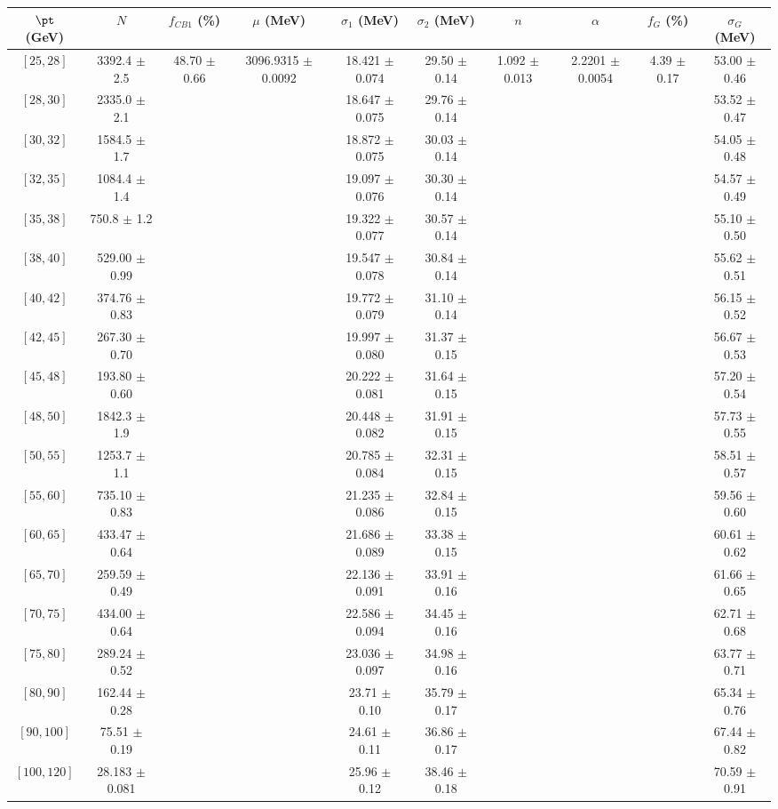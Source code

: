 \begin{tabular}{c||c|c|c|c|c|c|c|c|c}
$\pt$ (GeV) & $N$ & $f_{CB1}$ (\%)  & $\mu$ (MeV) & $\sigma_1$ (MeV) & $\sigma_2$ (MeV) & $n$ & $\alpha$ & $f_G$ (\%) & $\sigma_G$ (MeV) \\
\hline
$[25, 28]$ & 3392.4 $\pm$ 2.5 & \multirow{19}{*}{48.70 $\pm$ 0.66} & \multirow{19}{*}{3096.9315 $\pm$ 0.0092} & 18.421 $\pm$ 0.074 & 29.50 $\pm$ 0.14 & \multirow{19}{*}{1.092 $\pm$ 0.013} & \multirow{19}{*}{2.2201 $\pm$ 0.0054} & \multirow{19}{*}{4.39 $\pm$ 0.17} & 53.00 $\pm$ 0.46\\
$[28, 30]$ & 2335.0 $\pm$ 2.1 &  &  & 18.647 $\pm$ 0.075 & 29.76 $\pm$ 0.14 &  &  &  & 53.52 $\pm$ 0.47\\
$[30, 32]$ & 1584.5 $\pm$ 1.7 &  &  & 18.872 $\pm$ 0.075 & 30.03 $\pm$ 0.14 &  &  &  & 54.05 $\pm$ 0.48\\
$[32, 35]$ & 1084.4 $\pm$ 1.4 &  &  & 19.097 $\pm$ 0.076 & 30.30 $\pm$ 0.14 &  &  &  & 54.57 $\pm$ 0.49\\
$[35, 38]$ & 750.8 $\pm$ 1.2 &  &  & 19.322 $\pm$ 0.077 & 30.57 $\pm$ 0.14 &  &  &  & 55.10 $\pm$ 0.50\\
$[38, 40]$ & 529.00 $\pm$ 0.99 &  &  & 19.547 $\pm$ 0.078 & 30.84 $\pm$ 0.14 &  &  &  & 55.62 $\pm$ 0.51\\
$[40, 42]$ & 374.76 $\pm$ 0.83 &  &  & 19.772 $\pm$ 0.079 & 31.10 $\pm$ 0.14 &  &  &  & 56.15 $\pm$ 0.52\\
$[42, 45]$ & 267.30 $\pm$ 0.70 &  &  & 19.997 $\pm$ 0.080 & 31.37 $\pm$ 0.15 &  &  &  & 56.67 $\pm$ 0.53\\
$[45, 48]$ & 193.80 $\pm$ 0.60 &  &  & 20.222 $\pm$ 0.081 & 31.64 $\pm$ 0.15 &  &  &  & 57.20 $\pm$ 0.54\\
$[48, 50]$ & 1842.3 $\pm$ 1.9 &  &  & 20.448 $\pm$ 0.082 & 31.91 $\pm$ 0.15 &  &  &  & 57.73 $\pm$ 0.55\\
$[50, 55]$ & 1253.7 $\pm$ 1.1 &  &  & 20.785 $\pm$ 0.084 & 32.31 $\pm$ 0.15 &  &  &  & 58.51 $\pm$ 0.57\\
$[55, 60]$ & 735.10 $\pm$ 0.83 &  &  & 21.235 $\pm$ 0.086 & 32.84 $\pm$ 0.15 &  &  &  & 59.56 $\pm$ 0.60\\
$[60, 65]$ & 433.47 $\pm$ 0.64 &  &  & 21.686 $\pm$ 0.089 & 33.38 $\pm$ 0.15 &  &  &  & 60.61 $\pm$ 0.62\\
$[65, 70]$ & 259.59 $\pm$ 0.49 &  &  & 22.136 $\pm$ 0.091 & 33.91 $\pm$ 0.16 &  &  &  & 61.66 $\pm$ 0.65\\
$[70, 75]$ & 434.00 $\pm$ 0.64 &  &  & 22.586 $\pm$ 0.094 & 34.45 $\pm$ 0.16 &  &  &  & 62.71 $\pm$ 0.68\\
$[75, 80]$ & 289.24 $\pm$ 0.52 &  &  & 23.036 $\pm$ 0.097 & 34.98 $\pm$ 0.16 &  &  &  & 63.77 $\pm$ 0.71\\
$[80, 90]$ & 162.44 $\pm$ 0.28 &  &  & 23.71 $\pm$ 0.10 & 35.79 $\pm$ 0.17 &  &  &  & 65.34 $\pm$ 0.76\\
$[90, 100]$ & 75.51 $\pm$ 0.19 &  &  & 24.61 $\pm$ 0.11 & 36.86 $\pm$ 0.17 &  &  &  & 67.44 $\pm$ 0.82\\
$[100, 120]$ & 28.183 $\pm$ 0.081 &  &  & 25.96 $\pm$ 0.12 & 38.46 $\pm$ 0.18 &  &  &  & 70.59 $\pm$ 0.91\\
\end{tabular}
